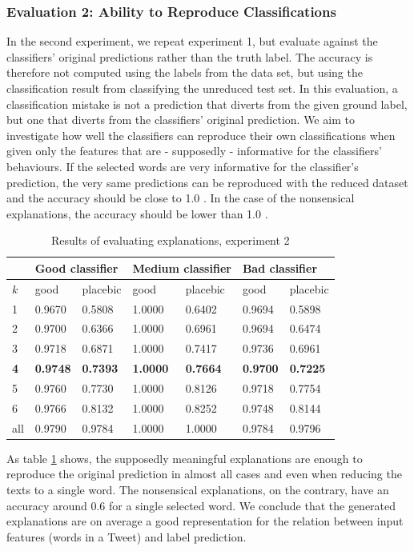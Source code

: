 \subsubsection{Evaluation 2: Ability to Reproduce Classifications}
In the second experiment, we repeat experiment 1, but evaluate against the classifiers' original predictions rather than the truth label. The accuracy is therefore not computed using the labels from the data set, but using the classification result from classifying the unreduced test set. In this evaluation, a classification mistake is not a prediction that diverts from the given ground label, but one that diverts from the classifiers' original prediction. We aim to investigate how well the classifiers can reproduce their own classifications when given only the features that are - supposedly - informative for the classifiers' behaviours. If the selected words are very informative for the classifier's prediction, the very same predictions can be reproduced with the reduced dataset and the accuracy should be close to 1.0 . In the case of the nonsensical explanations, the accuracy should be lower than 1.0 .\newline
\begin{table}[H]
	\centering
	\begin{tabular}{l|m{1.4cm}m{1.4cm}|m{1.4cm}m{1.4cm}|m{1.4cm}m{1.4cm}}
		& \multicolumn{2}{l|}{\textbf{Good classifier}} & \multicolumn{2}{l|}{\textbf{Medium classifier}} & \multicolumn{2}{l}{\textbf{Bad classifier}} \\ \midrule
		$k$& good & placebic & good & placebic & good & placebic \\ \midrule
		1  &  0.9670  &  0.5808 & 1.0000 & 0.6402 & 0.9694  &  0.5898  \\
		2  &  0.9700  &  0.6366 & 1.0000 & 0.6961 & 0.9694  &  0.6474  \\
		3  &  0.9718  &  0.6871 & 1.0000 & 0.7417 & 0.9736  &  0.6961  \\
		\textbf{4}  &  \textbf{0.9748}  &  \textbf{0.7393} & \textbf{1.0000} & \textbf{0.7664} & \textbf{0.9700}  &  \textbf{0.7225}  \\
		5  &  0.9760  &  0.7730 & 1.0000 & 0.8126 & 0.9718  &  0.7754  \\
		6  &  0.9766  &  0.8132 & 1.0000 & 0.8252 & 0.9748  &  0.8144  \\
		all  &  0.9790  &  0.9784 & 1.0000 & 1.0000 & 0.9784  &  0.9796  \\\bottomrule
	\end{tabular}
	\caption{Results of evaluating explanations, experiment 2}
	\label{tab:exp2}
\end{table}
\noindent As table \ref{tab:exp2} shows, the supposedly meaningful explanations are enough to reproduce the original prediction in almost all cases and even when reducing the texts to a single word. The nonsensical explanations, on the contrary, have an accuracy around 0.6 for a single selected word. We conclude that the generated explanations are on average a good representation for the relation between input features (words in a Tweet) and label prediction.


